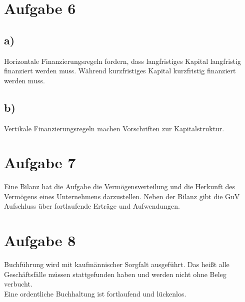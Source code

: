 \documentclass{article}
\begin{document}
	\section*{Aufgabe 6}
	\subsection*{a)}
	Horizontale Finanzierungsregeln fordern, dass langfristiges Kapital langfristig finanziert werden muss. Während kurzfristiges Kapital kurzfristig finanziert werden muss.
	\subsection*{b)}
	Vertikale Finanzierungsregeln machen Vorschriften zur Kapitalstruktur.
	\section*{Aufgabe 7}
	Eine Bilanz hat die Aufgabe die Vermögensverteilung und die Herkunft des Vermögens eines Unternehmens darzustellen. Neben der Bilanz gibt die GuV Aufschluss über fortlaufende Erträge und Aufwendungen.
	\section*{Aufgabe 8}
	Buchführung wird mit kaufmännischer Sorgfalt ausgeführt. Das heißt alle Geschäftsfälle müssen stattgefunden haben und werden nicht ohne Beleg verbucht. \\
	Eine ordentliche Buchhaltung ist fortlaufend und lückenlos. \\
\end{document}
